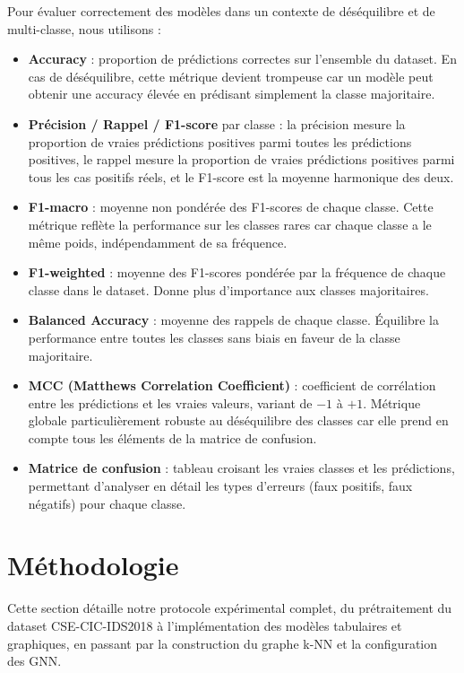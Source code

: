 ﻿\documentclass[11pt,a4paper]{article}
\begin{document}
Pour évaluer correctement des modèles dans un contexte de déséquilibre et de multi-classe, nous utilisons :
\begin{itemize}
    \item \textbf{Accuracy} : proportion de prédictions correctes sur l'ensemble du dataset. En cas de déséquilibre, cette métrique devient trompeuse car un modèle peut obtenir une accuracy élevée en prédisant simplement la classe majoritaire.
    \item \textbf{Précision / Rappel / F1-score} par classe : la précision mesure la proportion de vraies prédictions positives parmi toutes les prédictions positives, le rappel mesure la proportion de vraies prédictions positives parmi tous les cas positifs réels, et le F1-score est la moyenne harmonique des deux.
    \item \textbf{F1-macro} : moyenne non pondérée des F1-scores de chaque classe. Cette métrique reflète la performance sur les classes rares car chaque classe a le même poids, indépendamment de sa fréquence.
    \item \textbf{F1-weighted} : moyenne des F1-scores pondérée par la fréquence de chaque classe dans le dataset. Donne plus d'importance aux classes majoritaires.
    \item \textbf{Balanced Accuracy} : moyenne des rappels de chaque classe. Équilibre la performance entre toutes les classes sans biais en faveur de la classe majoritaire.
    \item \textbf{MCC (Matthews Correlation Coefficient)} : coefficient de corrélation entre les prédictions et les vraies valeurs, variant de $-1$ à $+1$. Métrique globale particulièrement robuste au déséquilibre des classes car elle prend en compte tous les éléments de la matrice de confusion.
    \item \textbf{Matrice de confusion} : tableau croisant les vraies classes et les prédictions, permettant d'analyser en détail les types d'erreurs (faux positifs, faux négatifs) pour chaque classe.
\end{itemize}

\section{Méthodologie}
\label{sec:methodologie}

Cette section détaille notre protocole expérimental complet, du prétraitement du dataset CSE-CIC-IDS2018 à l'implémentation des modèles tabulaires et graphiques, en passant par la construction du graphe k-NN et la configuration des GNN.
\end{document}
